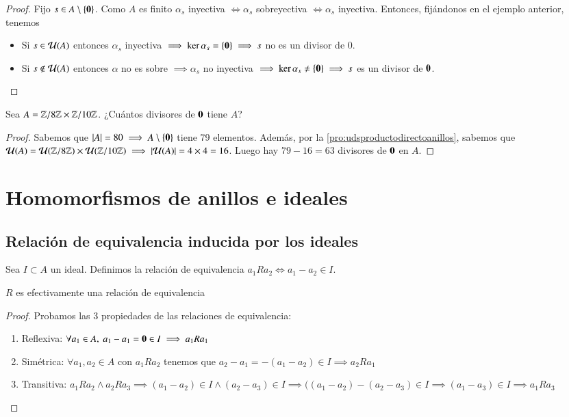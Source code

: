 \begin{proof}
	Fijo $s \in A \setminus \{\mathbf{0}\}$. Como $A$ es finito $\alpha_s$ inyectiva $\iff \alpha_s$ sobreyectiva $\iff \alpha_s$ inyectiva. Entonces, fijándonos en el ejemplo anterior, tenemos
	\begin{itemize}
		\item Si $s \in \mathcal{U}(A)$ entonces $\alpha_s$ inyectiva $\implies \ker \alpha_s = \{\mathbf{0}\} \implies s$ no es un divisor de $0$.
		\item Si $s \notin \mathcal{U}(A)$ entonces $\alpha$ no es sobre $\implies \alpha_s$ no inyectiva $\implies \ker \alpha_s \neq \{\mathbf{0}\} \implies s$ es un divisor de $\mathbf{0}$.
	\end{itemize}
\end{proof}

\begin{ej}
	Sea $A = \mathbb{Z}/8\mathbb{Z} \times \mathbb{Z}/10\mathbb{Z}$. ¿Cuántos divisores de $\mathbf{0}$ tiene $A$?
\end{ej}

\begin{proof}
	Sabemos que $|A| = 80 \implies A \setminus \{\mathbf{0}\}$ tiene 79 elementos. Además, por la \autoref{pro:udsproductodirectoanillos}, sabemos que $\mathcal{U}(A) = \mathcal{U}(\mathbb{Z}/8\mathbb{Z}) \times \mathcal{U}(\mathbb{Z}/10\mathbb{Z}) \implies |\mathcal{U}(A)| = 4 \times 4 = 16$. Luego hay $79 - 16 = 63$ divisores de $\mathbf{0}$ en $A$.
\end{proof}

\section{Homomorfismos de anillos e ideales}

\subsection{Relación de equivalencia inducida por los ideales}

\begin{dfn}
	Sea $I \subset A$ un ideal. Definimos la relación de equivalencia $a_1 R a_2 \iff a_1 - a_2 \in I$.
\end{dfn}

\begin{pro}
	$R$ es efectivamente una relación de equivalencia
\end{pro}

\begin{proof}Probamos las 3 propiedades de las relaciones de equivalencia:
	\begin{enumerate}
		\item Reflexiva: $\forall a_1 \in A,\ a_1 - a_1 = \mathbf{0} \in I \implies a_1Ra_1$
		\item Simétrica: $\forall a_1, a_2 \in A$ con $a_1 R a_2$ tenemos que $a_2 - a_1 = -(a_1 - a_2) \in I \implies a_2 R a_1$
		\item Transitiva: $a_1Ra_2 \land a_2Ra_3 \implies (a_1 - a_2) \in I \land (a_2 - a_3) \in I \implies ((a_1 - a_2) - (a_2 - a_3) \in I \implies (a_1 - a_3) \in I \implies a_1 R a_3$
	\end{enumerate}
\end{proof}

